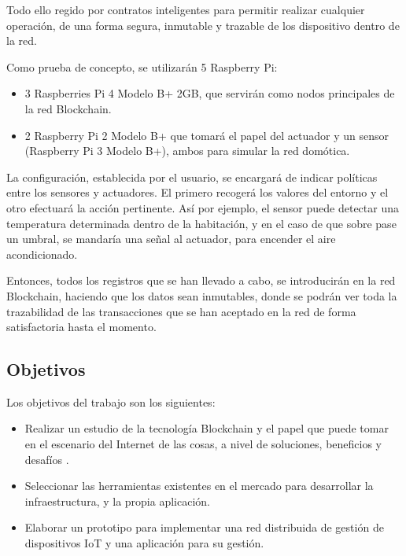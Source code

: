 \vspace{5mm}

\noindent Todo ello regido por contratos inteligentes para permitir realizar cualquier operación, de una forma segura, 
inmutable y trazable de los dispositivo dentro de la red.

\vspace{20mm}

\noindent Como prueba de concepto, se utilizarán 5 Raspberry Pi: 

\begin{itemize}
	\item 3 Raspberries Pi 4 Modelo B+ 2GB, que servirán como nodos principales de la red Blockchain.
	\item 2 Raspberry Pi 2 Modelo B+ que tomará el papel del actuador y un sensor (Raspberry Pi 3 Modelo B+), ambos 
	para simular la red domótica.
\end{itemize}

\noindent La configuración, establecida por el usuario, se encargará de indicar políticas entre los sensores 
y actuadores. El primero recogerá los valores del entorno y el otro efectuará la acción pertinente. Así por ejemplo, 
el sensor puede detectar una temperatura determinada dentro de la habitación, y en el caso de que sobre pase un 
umbral, se mandaría una señal al actuador, para encender el aire acondicionado. \cite{huh2017managing}

\vspace{5mm}

\noindent Entonces, todos los registros que se han llevado a cabo, se introducirán en la red Blockchain, haciendo que 
los datos sean inmutables, donde se podrán ver toda la trazabilidad de las transacciones que se han aceptado en la red 
de forma satisfactoria hasta el momento.

\subsection{Objetivos}

Los objetivos del trabajo son los siguientes:

\begin{itemize}
    \item Realizar un estudio de la tecnología Blockchain y el papel que puede tomar en el escenario del Internet de 
    las cosas, a nivel de soluciones, beneficios y desafíos \cite{khan2018iot, reyna2018blockchain}. 
    \item Seleccionar las herramientas existentes en el mercado para desarrollar la infraestructura, y la propia 
    aplicación.
    \item Elaborar un prototipo para implementar una red distribuida de gestión de dispositivos IoT y una aplicación
    para su gestión.
\end{itemize}

